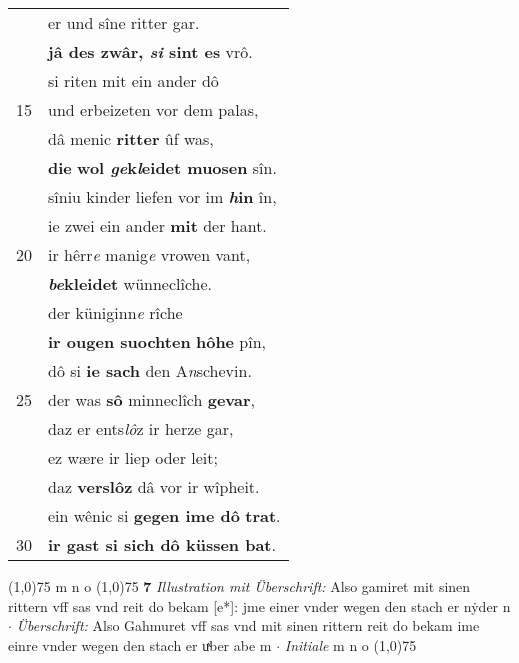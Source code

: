 \documentclass[8pt,a4paper,notitlepage]{article}
\begin{document}
\begin{table}[ht]
\begin{minipage}[t]{0.5\linewidth}
\begin{tabular}{rl}
 & er und sîne ritter gar.\\ 
 & \textbf{jâ des zwâr, \textit{si} sint es} vrô.\\ 
 & si riten mit ein ander dô\\ 
15 & und erbeizeten vor dem palas,\\ 
 & dâ menic \textbf{ritter} ûf was,\\ 
 & \textbf{die} \textbf{wol \textit{ge}k\textit{l}eidet muosen} sîn.\\ 
 & sîniu kinder liefen vor im \textbf{\textit{h}in} în,\\ 
 & ie zwei ein ander \textbf{mit} der hant.\\ 
20 & ir hêrr\textit{e} manig\textit{e} vrowen vant,\\ 
 & \textbf{\textit{be}kleidet} wünneclîche.\\ 
 & der küniginn\textit{e} rîche\\ 
 & \textbf{ir ougen suochten} \textbf{hôhe} pîn,\\ 
 & dô si \textbf{ie sach} den A\textit{n}schevin.\\ 
25 & der was \textbf{sô} minneclîch \textbf{gevar},\\ 
 & daz er ents\textit{lô}z ir herze gar,\\ 
 & ez wære ir liep oder leit;\\ 
 & daz \textbf{verslôz} dâ vor ir wîpheit.\\ 
 & ein wênic si \textbf{gegen ime dô} \textbf{trat}.\\ 
30 & \textbf{ir gast si sich dô küssen bat}.\\ 
\end{tabular}
\scriptsize
\line(1,0){75} \newline
m n o \newline
\line(1,0){75} \newline
\textbf{7} \textit{Illustration mit Überschrift:} Also gamiret mit sinen rittern vff sas vnd reit do bekam [e*]: jme einer vnder wegen den stach er nẏder n   $\cdot$ \textit{Überschrift:} Also Gahmuret vff sas vnd mit sinen rittern reit do bekam ime einre vnder wegen den stach er uͯber abe m   $\cdot$ \textit{Initiale} m n o  \newline
\line(1,0){75} \newline

\end{minipage}
\end{table}
\end{document}
